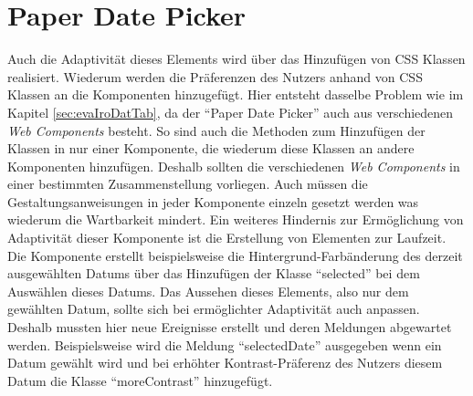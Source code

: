 \documentclass[12pt, paper=a4, bibtotoc, toc=listof, headsepline=true]{scrreprt}
\begin{document}
	\section{Paper Date Picker} 
	Auch die Adaptivität dieses Elements wird über das Hinzufügen von \ac{CSS} Klassen realisiert. Wiederum werden die Präferenzen des Nutzers anhand von \ac{CSS} Klassen an die Komponenten hinzugefügt. Hier entsteht dasselbe Problem wie im Kapitel \ref{sec:evaIroDatTab}, da der \enquote{Paper Date Picker} auch aus verschiedenen \emph{Web Components} besteht. So sind auch die Methoden zum Hinzufügen der Klassen in nur einer Komponente, die wiederum diese Klassen an andere Komponenten hinzufügen. Deshalb sollten die verschiedenen \emph{Web Components} in einer bestimmten Zusammenstellung vorliegen. Auch müssen die Gestaltungsanweisungen in jeder Komponente einzeln gesetzt werden was wiederum die Wartbarkeit mindert. Ein weiteres Hindernis zur Ermöglichung von Adaptivität dieser Komponente ist die Erstellung von Elementen zur Laufzeit. Die Komponente erstellt beispielsweise die Hintergrund-Farbänderung des derzeit ausgewählten Datums über das Hinzufügen der Klasse \enquote{selected} bei dem Auswählen dieses Datums. Das Aussehen dieses Elements, also nur dem gewählten Datum, sollte sich bei ermöglichter Adaptivität auch anpassen. Deshalb mussten hier neue Ereignisse erstellt und deren Meldungen abgewartet werden. Beispielsweise wird die Meldung \enquote{selectedDate} ausgegeben wenn ein Datum gewählt wird und bei erhöhter Kontrast-Präferenz des Nutzers diesem Datum die Klasse \enquote{moreContrast} hinzugefügt.
	
\end{document}
